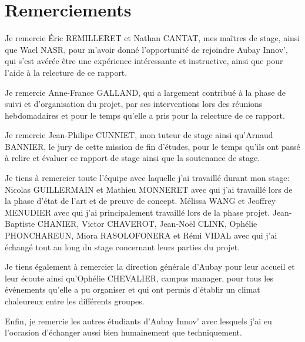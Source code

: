\documentclass[11pt]{article}
\begin{document}
  \section{Remerciements}    
    Je remercie Éric REMILLERET et Nathan CANTAT, mes maîtres de stage, 
    ainsi que Wael NASR, pour m'avoir donné l'opportunité de rejoindre 
    Aubay Innov', qui s'est avérée être une expérience intéressante 
    et instructive, ainsi que pour l'aide à la relecture de ce rapport.    
    
    Je remercie Anne-France GALLAND, qui a largement contribué à la phase de suivi et d'organisation du projet, par ses interventions 
    lors des réunions hebdomadaires et pour le temps qu'elle a pris pour la relecture de ce rapport.    
    
    Je remercie Jean-Philipe CUNNIET, mon tuteur de stage ainsi qu'Arnaud BANNIER, le jury de cette mission de fin d'études, 
    pour le temps qu'ils ont passé à relire et évaluer ce rapport de stage ainsi que la soutenance de stage.    

    Je tiens à remercier toute l'équipe avec laquelle j'ai 
    travaillé durant mon stage:    
    Nicolas GUILLERMAIN et Mathieu MONNERET avec qui j'ai travaillé lors 
    de la phase d'état de l'art et de preuve de concept.
    Mélissa WANG et Jeoffrey MENUDIER avec qui j'ai principalement 
    travaillé lors de la phase projet. 
    Jean-Baptiste CHANIER, Victor CHAVEROT, Jean-Noël CLINK,
    Ophélie PHONCHAREUN, Miora RASOLOFONERA et Rémi VIDAL avec qui j'ai échangé tout au 
    long du stage concernant leurs parties du projet.       
    
    Je tiens également à remercier la direction générale d'Aubay pour leur accueil et leur écoute ainsi qu'Ophélie CHEVALIER, campus manager, 
    pour tous les événements qu'elle a pu organiser et qui ont permis d'établir un climat chaleureux entre les différents groupes.
        
    Enfin, je remercie les autres étudiants d’Aubay Innov' avec lesquels j'ai eu l'occasion d'échanger aussi bien humainement que techniquement.

  \pagebreak
\end{document}
